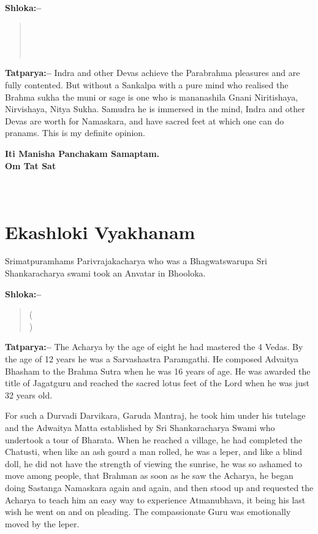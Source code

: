 \textbf{Shloka:–}

\begin{verse}
 \\\\\\ 
\end{verse}

\textbf{Tatparya:–} Indra and other Devas achieve the Parabrahma pleasures and are fully contented. But without a Sankalpa with a pure mind who realised the Brahma sukha the muni or sage is one who is mananashila Gnani Niritishaya, Nirvishaya, Nitya Sukha. Samudra he is immersed in the mind, Indra and other Devas are worth for Namaskara, and have sacred feet at which one can do pranams. This is my definite opinion.

\begin{center}
\textbf{Iti Manisha Panchakam Samaptam.\\ Om Tat Sat}
\end{center}

\chapter{\\ Ekashloki Vyakhanam}

Srimatpuramhams Parivrajakacharya who was a Bhagwatswarupa Sri Shankaracharya swami took an Anvatar in Bhooloka.

\textbf{Shloka:–}

\begin{verse}
 (\\)
\end{verse}

\textbf{Tatparya:–} The Acharya by the age of eight he had mastered the 4 Vedas. By the age of 12 years he was a Sarvashastra Paramgathi. He composed Advaitya Bhasham to the Brahma Sutra when he was 16 years of age. He was awarded the title of Jagatguru and reached the sacred lotus feet of the Lord when he was just 32 years old.

For such a Durvadi Darvikara, Garuda Mantraj, he took him under his tutelage and the Adwaitya Matta established by Sri Shankaracharya Swami who undertook a tour of Bharata. When he reached a village, he had completed the Chatusti, when like an ash gourd a man rolled, he was a leper, and like a blind doll, he did not have the strength of viewing the sunrise, he was so ashamed to move among people, that Brahman as soon as he saw the Acharya, he began doing Sastanga Namaskara again and again, and then stood up and requested the Acharya to teach him an easy way to experience Atmanubhava, it being his last wish he went on and on pleading. The compassionate Guru was emotionally moved by the leper.


